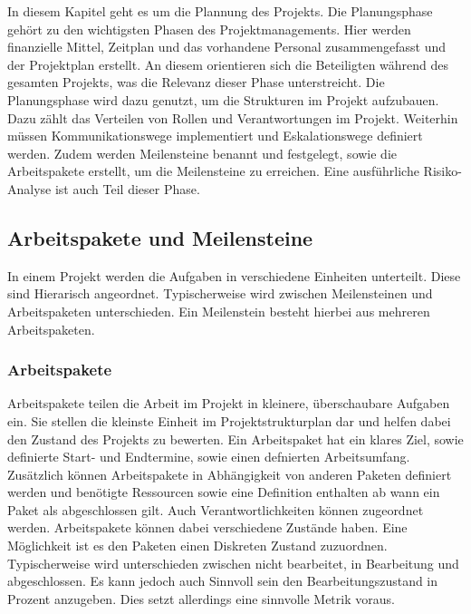 \documentclass[ThesisDJ.tex]{subfiles}
\begin{document}
In diesem Kapitel geht es um die Plannung des Projekts. Die Planungsphase gehört zu den wichtigsten Phasen des Projektmanagements. Hier werden finanzielle Mittel, Zeitplan und das vorhandene Personal zusammengefasst und der Projektplan erstellt. An diesem orientieren sich die Beteiligten während des gesamten Projekts, was die Relevanz dieser Phase unterstreicht. Die Planungsphase wird dazu genutzt, um die Strukturen im Projekt aufzubauen. Dazu zählt das Verteilen von Rollen und Verantwortungen im Projekt. Weiterhin müssen Kommunikationswege implementiert und Eskalationswege definiert werden. 
Zudem werden Meilensteine benannt und festgelegt, sowie die Arbeitspakete erstellt, um die Meilensteine zu erreichen. Eine ausführliche Risiko-Analyse ist auch Teil dieser Phase. 

\subsection{Arbeitspakete und Meilensteine}
In einem Projekt werden die Aufgaben in verschiedene Einheiten unterteilt. Diese sind Hierarisch angeordnet. Typischerweise wird zwischen Meilensteinen und Arbeitspaketen unterschieden.
Ein Meilenstein besteht hierbei aus mehreren Arbeitspaketen.

\subsubsection{Arbeitspakete}
Arbeitspakete teilen die Arbeit im Projekt in kleinere, überschaubare Aufgaben ein. Sie stellen die kleinste Einheit im
Projektstrukturplan dar und helfen dabei den Zustand des Projekts zu bewerten.
Ein Arbeitspaket hat ein klares Ziel, sowie definierte Start- und Endtermine, sowie einen defnierten Arbeitsumfang. 
Zusätzlich können Arbeitspakete in Abhängigkeit von anderen Paketen definiert werden und benötigte Ressourcen sowie 
eine Definition enthalten ab wann ein Paket als abgeschlossen gilt. Auch Verantwortlichkeiten können zugeordnet werden. 
Arbeitspakete können dabei verschiedene Zustände haben. Eine Möglichkeit ist es den Paketen einen Diskreten Zustand 
zuzuordnen. Typischerweise wird unterschieden zwischen nicht bearbeitet, in Bearbeitung und abgeschlossen. Es kann jedoch auch 
Sinnvoll sein den Bearbeitungszustand in Prozent anzugeben. Dies setzt allerdings eine sinnvolle Metrik voraus. 
\end{document}
